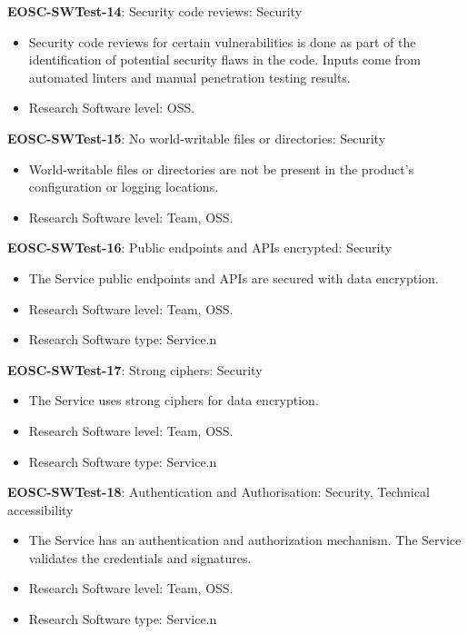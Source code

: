 \textbf{EOSC-SWTest-14}: Security code reviews: Security

\begin{itemize}
    \item Security code reviews for certain vulnerabilities is done as part of the identification of potential security flaws in the code. Inputs  come from automated linters and manual penetration testing results. \cite{gillies_modelling_1992,shepherdson_cessda_2019,orviz_set_2017}
    \item Research Software level: OSS.
\end{itemize}

\textbf{EOSC-SWTest-15}: No world-writable files or directories: Security

\begin{itemize}
    \item World-writable files or directories are not be present in the product's configuration or logging locations. \cite{orviz_set_2017}
    \item Research Software level: Team, OSS.
\end{itemize}

\textbf{EOSC-SWTest-16}: Public endpoints and APIs encrypted: Security

\begin{itemize}
    \item The Service public endpoints and APIs are secured with data encryption. \cite{orviz_fernandez_eosc-synergy_2020}
    \item Research Software level: Team, OSS.
    \item Research Software type: Service.n\end{itemize}

\textbf{EOSC-SWTest-17}: Strong ciphers: Security

\begin{itemize}
    \item The Service uses strong ciphers for data encryption. \cite{orviz_fernandez_eosc-synergy_2020}
    \item Research Software level: Team, OSS.
    \item Research Software type: Service.n\end{itemize}

\textbf{EOSC-SWTest-18}: Authentication and Authorisation: Security, Technical accessibility

\begin{itemize}
    \item The Service has an authentication and authorization mechanism. The Service validates the credentials and signatures. \cite{shepherdson_cessda_2019,orviz_fernandez_eosc-synergy_2020}
    \item Research Software level: Team, OSS.
    \item Research Software type: Service.n\end{itemize}

